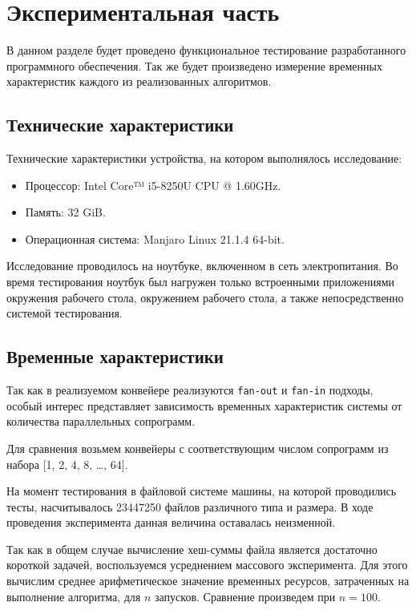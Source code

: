 \chapter{Экспериментальная часть}

В данном разделе будет проведено функциональное тестирование разработанного программного обеспечения. Так же будет произведено измерение временных характеристик каждого из реализованных алгоритмов. 

\section{Технические характеристики}

Технические характеристики устройства, на котором выполнялось исследование:

\begin{itemize}
	\item Процессор: Intel Core™ i5-8250U \cite{i5} CPU @ 1.60GHz.
	\item Память: 32 GiB.
	\item Операционная система: Manjaro \cite{manjaro} Linux \cite{linux} 21.1.4 64-bit.

\end{itemize}

Исследование проводилось на ноутбуке, включенном в сеть электропитания. Во время тестирования ноутбук был нагружен только встроенными приложениями окружения рабочего стола, окружением рабочего стола, а также непосредственно системой тестирования.

\section{Временные характеристики}

Так как в реализуемом конвейере реализуются \texttt{fan-out} и \texttt{fan-in} подходы, особый интерес представляет зависимость временных характеристик системы от количества параллельных сопрограмм.

Для сравнения возьмем конвейеры с соответствующим числом сопрограмм из набора [1, 2, 4, 8, \dots, 64].

На момент тестирования в файловой системе машины, на которой проводились тесты, насчитывалось 23447250 файлов различного типа и размера. В ходе проведения эксперимента данная величина оставалась неизменной.

Так как в общем случае вычисление хеш-суммы файла является достаточно короткой задачей, воспользуемся усреднением массового эксперимента.  Для этого вычислим среднее арифметическое значение временных ресурсов, затраченных на выполнение алгоритма, для $n$ запусков. Сравнение произведем при $n = 100$.

